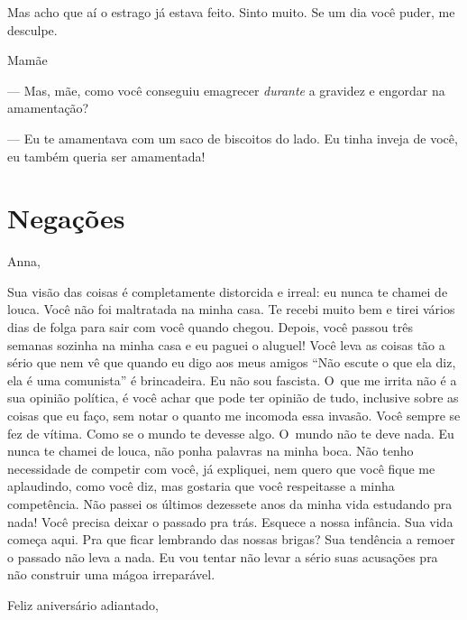 Mas acho que aí o estrago já estava feito. Sinto muito. Se um dia você
puder, me desculpe.

\begin{flushright}Mamãe\end{flushright}


\pagebreak\mbox{} 

\vspace*{.3\textheight} 

--- Mas, mãe, como você conseguiu emagrecer \emph{durante} a gravidez e
engordar na amamentação?

--- Eu te amamentava com um saco de biscoitos do lado. Eu tinha inveja
de você, eu também queria ser amamentada!

\chapter{Negações}

\vspace{-3em} 

Anna,

\smallskip{} 

Sua visão das coisas é completamente distorcida e irreal: eu nunca te
chamei de louca. Você não foi maltratada na minha casa. Te recebi muito
bem e tirei vários dias de folga para sair com você quando chegou.
Depois, você passou três semanas sozinha na minha casa e eu paguei o
aluguel! Você leva as coisas tão a sério que nem vê que quando eu digo
aos meus amigos ``Não escute o que ela diz, ela é uma comunista'' é
brincadeira. Eu não sou fascista. O~que me irrita não é a sua opinião
política, é você achar que pode ter opinião de tudo, inclusive sobre as
coisas que eu faço, sem notar o quanto me incomoda essa invasão. Você
sempre se fez de vítima. Como se o mundo te devesse algo. O~mundo não te
deve nada. Eu nunca te chamei de louca, não ponha palavras na minha
boca. Não tenho necessidade de competir com você, já expliquei, nem
quero que você fique me aplaudindo, como você diz, mas gostaria que você
respeitasse a minha competência. Não passei os últimos dezessete anos da
minha vida estudando pra nada! Você precisa deixar o passado pra trás.
Esquece a nossa infância. Sua vida começa aqui. Pra que ficar lembrando
das nossas brigas? Sua tendência a remoer o passado não leva a nada. Eu
vou tentar não levar a sério suas acusações pra não construir uma mágoa
irreparável.

\smallskip{}  \begin{flushright}Feliz aniversário adiantado,\end{flushright}

